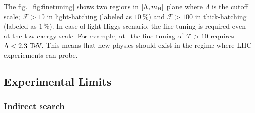 The fig.~\ref{fig:finetuning} \cite{Kolda:2000wi} shows two regions in $[\Lambda,m_{\mathrm{H}}]$ plane
where $\Lambda$ is the cutoff scale; 
$\mathcal{F}>10$ in light-hatching (labeled as $10~\%$)
and $\mathcal{F}>100$ in thick-hatching (labeled as $1~\%$).  
In case of light Higgs scenario, the fine-tuning is required even at the low energy scale. 
For example, at  \GeV\ the fine-tuning of $\mathcal{F}>10$ requires 
$\Lambda<2.3~\mathrm{Te\kern -0.1em V}$. This means that new physics should exist in the regime where 
LHC experiements can probe.

\newpage
\subsection{Experimental Limits} 

%
\subsubsection{Indirect search} 

